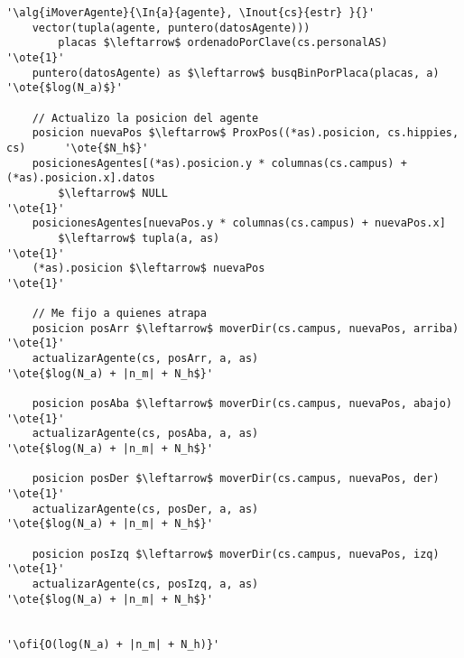 \begin{lstlisting}[mathescape]
'\alg{iMoverAgente}{\In{a}{agente}, \Inout{cs}{estr} }{}'
	vector(tupla(agente, puntero(datosAgente))) 
		placas $\leftarrow$ ordenadoPorClave(cs.personalAS)						'\ote{1}'
	puntero(datosAgente) as $\leftarrow$ busqBinPorPlaca(placas, a)				'\ote{$log(N_a)$}'

	// Actualizo la posicion del agente
	posicion nuevaPos $\leftarrow$ ProxPos((*as).posicion, cs.hippies, cs)		'\ote{$N_h$}'
	posicionesAgentes[(*as).posicion.y * columnas(cs.campus) + (*as).posicion.x].datos 
		$\leftarrow$ NULL														'\ote{1}'
	posicionesAgentes[nuevaPos.y * columnas(cs.campus) + nuevaPos.x] 
		$\leftarrow$ tupla(a, as)												'\ote{1}'
	(*as).posicion $\leftarrow$ nuevaPos										'\ote{1}'

	// Me fijo a quienes atrapa 
	posicion posArr $\leftarrow$ moverDir(cs.campus, nuevaPos, arriba)			'\ote{1}'
	actualizarAgente(cs, posArr, a, as) 				'\ote{$log(N_a) + |n_m| + N_h$}'

	posicion posAba $\leftarrow$ moverDir(cs.campus, nuevaPos, abajo)			'\ote{1}'
	actualizarAgente(cs, posAba, a, as) 				'\ote{$log(N_a) + |n_m| + N_h$}'

	posicion posDer $\leftarrow$ moverDir(cs.campus, nuevaPos, der)				'\ote{1}'
	actualizarAgente(cs, posDer, a, as) 				'\ote{$log(N_a) + |n_m| + N_h$}'

	posicion posIzq $\leftarrow$ moverDir(cs.campus, nuevaPos, izq)				'\ote{1}'
	actualizarAgente(cs, posIzq, a, as) 				'\ote{$log(N_a) + |n_m| + N_h$}'


'\ofi{O(log(N_a) + |n_m| + N_h)}'
\end{lstlisting}

